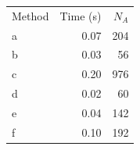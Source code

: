 \begin{tabular}{lrr}
\hline
Method & Time (s) & $N_A$ \\
a & 0.07 & 204 \\
b & 0.03 & 56 \\
c & 0.20 & 976 \\
d & 0.02 & 60 \\
e & 0.04 & 142 \\
f & 0.10 & 192 \\
\hline
\end{tabular}
